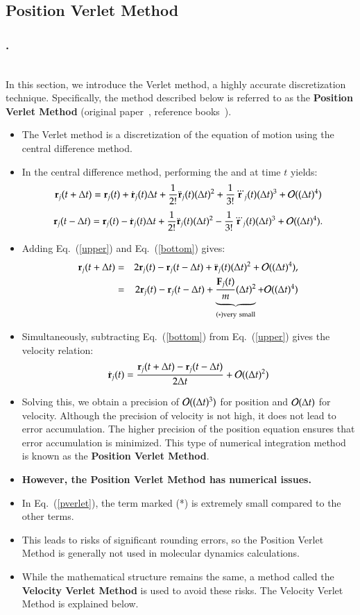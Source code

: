 \documentclass[aspectratio=169,dvipdfmx,cjk,handout,hyperref,8pt]{beamer} %
\newcommand{\TK}[1]{{\bf \color{red} #1}}
\newcommand{\tk}[1]{{\bf \color{blue} #1}}
\theoremstyle{example}
\newcommand{\be}{\begin{equation}}
\newcommand{\ee}{\end{equation}}
\newcommand{\bi}{\begin{itemize}}
\newcommand{\ei}{\end{itemize}}
\newcommand{\bea}{\begin{eqnarray}}
\newcommand{\eea}{\end{eqnarray}}
\begin{document}
\subsection{Position Verlet Method}
\begin{frame}[allowframebreaks]
\frametitle{\bf \thesection.\thesubsection~\insertsubsection}
\tk{}\\
In this section, we introduce the Verlet method, a highly accurate discretization technique. Specifically, the method described below is referred to as the \TK{Position Verlet Method} (original paper~\cite{Verlet1967Phys.Rev.}, reference books~\cite{Frenkel2001,Allen2017,Okazaki2011}).
\bi
\item The Verlet method is a discretization of the equation of motion using the central difference method.
\item In the central difference method, performing the  and  at time $t$ yields:
\be
{\bf r}_j(t+\Delta t) = {\bf r}_j(t)+\dot{{\bf r}}_j(t)\Delta t+\frac{1}{2!}\ddot{{\bf r}}_j(t)(\Delta t)^2+\frac{1}{3!}\dddot{{\bf r}}_j(t)(\Delta t)^3+{\cal O}((\Delta t)^4)
\label{upper}
\ee
\be
{\bf r}_j(t-\Delta t) = {\bf r}_j(t)-\dot{{\bf r}}_j(t)\Delta t+\frac{1}{2!}\ddot{{\bf r}}_j(t)(\Delta t)^2-\frac{1}{3!}\dddot{{\bf r}}_j(t)(\Delta t)^3+{\cal O}((\Delta t)^4).
\label{bottom}
\ee
\item Adding Eq.~(\ref{upper}) and Eq.~(\ref{bottom}) gives:
\bea
{\bf r}_j(t+\Delta t) &=& 2{\bf r}_j(t)-{\bf r}_j(t-\Delta t)+\ddot{{\bf r}}_j(t)(\Delta t)^2+{\cal O}((\Delta t)^4), \nonumber\\
&=& 2{\bf r}_j(t)-{\bf r}_j(t-\Delta t)+\underbrace{\frac{{\bf F}_j(t)}{m}(\Delta t)^2}_{(*)\mathrm {very\ small}}+{\cal O}((\Delta t)^4)
\label{pverlet}
\eea
\item Simultaneously, subtracting Eq.~(\ref{bottom}) from Eq.~(\ref{upper}) gives the velocity relation:
\bea
\dot{{\bf r}}_j(t) = \frac{{\bf r}_j(t+\Delta t)-{\bf r}_j(t-\Delta t)}{2\Delta t }+{\cal O}((\Delta t)^2)
\eea
\item Solving this, we obtain a precision of ${\cal O} ((\Delta t)^3)$ for position and ${\cal O} (\Delta t) $ for velocity. Although the precision of velocity is not high, it does not lead to error accumulation. The higher precision of the position equation ensures that error accumulation is minimized. This type of numerical integration method is known as the \tk{Position Verlet Method}.
\item \TK{However, the Position Verlet Method has numerical issues.} 
\item In Eq.~(\ref {pverlet}), the term marked (*) is extremely small compared to the other terms.
\item This leads to risks of significant rounding errors, so the Position Verlet Method is generally not used in molecular dynamics calculations.
\item While the mathematical structure remains the same, a method called the \TK{Velocity Verlet Method} is used to avoid these risks. The Velocity Verlet Method is explained below.
\ei
\end{frame}
\end{document}
